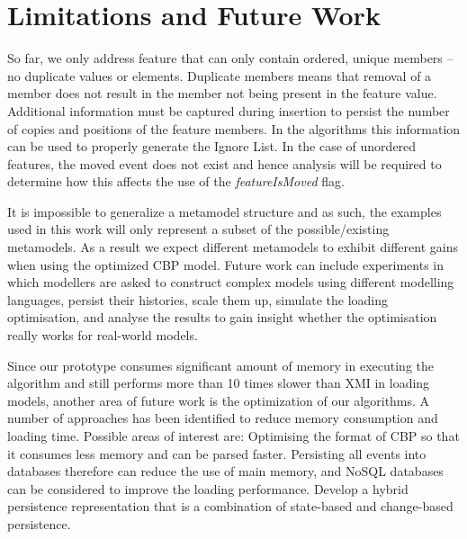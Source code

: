 \documentclass{llncs}
\begin{document}
\section{Limitations and Future Work}
\label{sec:limitations_and_future_work}
So far, we only address feature that can only contain ordered, unique members -- no duplicate values or elements.
Duplicate members means that removal of a member does not result in the member not being present in the feature value.
Additional information must be captured during insertion to persist the number of copies and positions of the feature members.
In the algorithms this information can be used to properly generate the Ignore List.
In the case of unordered features, the moved event does not exist and hence analysis will be required to determine how this affects the use of the \emph{featureIsMoved} flag.


It is impossible to generalize a metamodel structure and as such, the examples used in this work will only represent a subset of the possible/existing metamodels.
As a result we expect different metamodels to exhibit different gains when using the optimized CBP model. 
Future work can include experiments in which modellers are asked to construct complex models using different modelling languages, persist their histories, scale them up, simulate the loading optimisation, and analyse the results to gain insight whether the optimisation really works for real-world models. 

Since our prototype consumes significant amount of memory in executing the algorithm and still performs more than 10 times slower than XMI in loading models, another area of future work is the optimization of our algorithms.
A number of approaches has been identified to reduce memory consumption and loading time.
Possible areas of interest are:
Optimising the format of CBP so that it consumes less memory and can be parsed faster.
Persisting all events into databases therefore can reduce the use of main memory, and NoSQL databases can be considered to improve the loading performance.
Develop a hybrid persistence representation that is a combination of state-based and change-based persistence.
\end{document}
